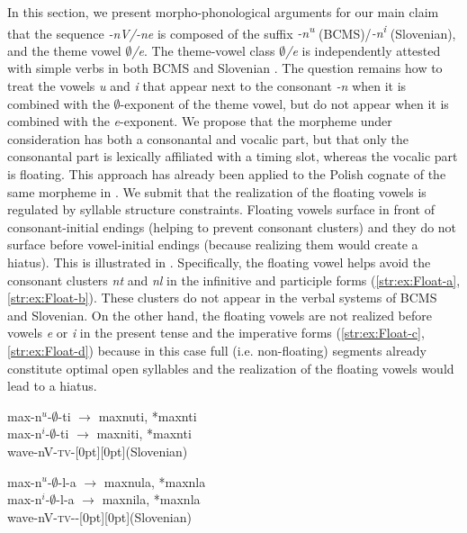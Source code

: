 \documentclass[output=paper,colorlinks,citecolor=brown]{langscibook}
\begin{document}
In this section, we present morpho-phonological arguments for our main claim that the sequence \textit{-nV/-ne} is composed of the suffix \textit{-n\textsuperscript{u}} (BCMS)/\textit{-n\textsuperscript{i}} (Slovenian), and the theme vowel \textit{$∅$/e}. 
The theme-vowel class \textit{$∅$/e} is  independently attested with simple verbs in both BCMS and Slovenian \citep{database_Boban}. The question remains how to treat the vowels \textit{u} and \textit{i} that appear next to the consonant \textit{-n} when it is combined with the \textit{$∅$}-exponent of the theme vowel, but do not appear when it is combined with the \textit{e}-exponent. We propose that the morpheme under consideration has both a consonantal and vocalic part, but that only the consonantal part is lexically affiliated with a timing slot, whereas the vocalic part is floating. This approach has already been applied to the Polish cognate of the same morpheme in \citet{Zdziebko2017}. We submit that the realization of the floating vowels is regulated by syllable structure constraints. Floating vowels surface in front of consonant-initial endings (helping to prevent consonant clusters) and they do not surface before vowel-initial endings (because realizing them would create a hiatus). This is illustrated in . Specifically, the floating vowel helps avoid the consonant clusters \textit{nt} and \textit{nl} in the infinitive and participle forms (\ref{str:ex:Float-a}, \ref{str:ex:Float-b}). These clusters do not appear in the verbal systems of BCMS and Slovenian. On the other hand, the floating vowels are not realized before vowels \textit{e} or \textit{i} in the present tense and the imperative forms (\ref{str:ex:Float-c}, \ref{str:ex:Float-d}) because in this case full (i.e. non-floating) segments already constitute optimal open syllables and the realization of the floating vowels would lead to a hiatus.

\ea\label{str:ex:Float}
	\ea \gll max-n$^u$-$∅$-ti $→$ maxnuti, *maxnti \\ 
max-n$^i$-$∅$-ti $→$ maxniti, *maxnti \\ 
\glt wave-nV-\textsc{tv}-{\INF}\hfill \raisebox{\baselineskip}[0pt][0pt]{(Slovenian)}\label{str:ex:Float-a}

\ex \gll max-n$^u$-$∅$-l-a $→$ maxnula, *maxnla \\
max-n$^i$-$∅$-l-a $→$ maxnila, *maxnla \\ 
\glt wave-nV-\textsc{tv}-{\PST-\FEM}\hfill \raisebox{\baselineskip}[0pt][0pt]{(Slovenian)}\label{str:ex:Float-b}
\end{document}
